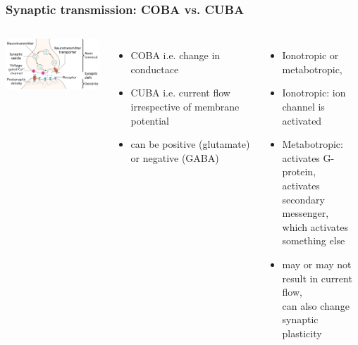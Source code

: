 \documentclass{beamer}
\begin{document}
\begin{frame}
\frametitle{Synaptic transmission: COBA vs. CUBA}

\begin{columns}
\includegraphics[width=\textwidth]{fig/SynapseSchematic.png}\\
\begin{itemize}
\item COBA i.e. change in conductace
\item CUBA i.e. current flow irrespective of membrane potential
\item can be positive (glutamate) or negative (GABA)\\

\end{itemize}
\begin{itemize}
\item Ionotropic or metabotropic,
\item Ionotropic: ion channel is activated
\item Metabotropic:\\
 activates G-protein,\\
  activates secondary messenger,\\
   which activates something else
\item may or may not result in current flow,\\
 can also change synaptic plasticity
\end{itemize}
\end{columns}



\end{frame}
\end{document}
